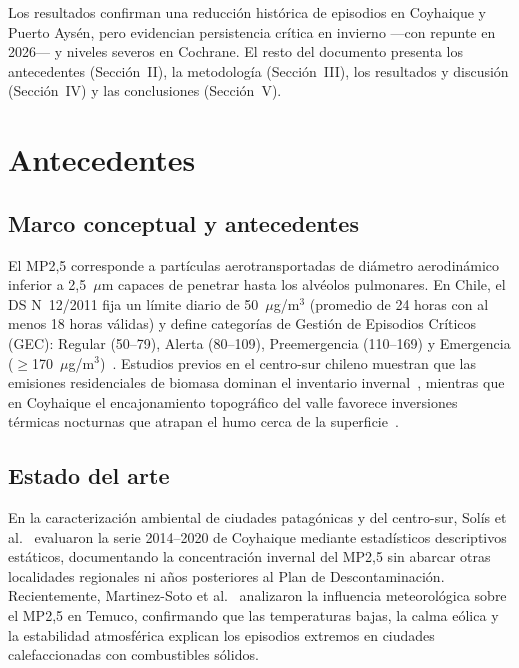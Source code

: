 \documentclass[conference]{IEEEtran}
\begin{document}
Los resultados confirman una reducci{\'o}n hist{\'o}rica de episodios en Coyhaique y Puerto Ays{\'e}n, pero evidencian persistencia cr{\'i}tica en invierno ---con repunte en 2026--- y niveles severos en Cochrane. El resto del documento presenta los antecedentes (Secci{\'o}n~II), la metodolog{\'i}a (Secci{\'o}n~III), los resultados y discusi{\'o}n (Secci{\'o}n~IV) y las conclusiones (Secci{\'o}n~V).

\section{Antecedentes}

\subsection{Marco conceptual y antecedentes}
El MP2,5 corresponde a part{\'i}culas aerotransportadas de di{\'a}metro aerodin{\'a}mico inferior a 2,5~$\mu$m capaces de penetrar hasta los alv{\'e}olos pulmonares. En Chile, el DS N\textdegree~12/2011 fija un l{\'i}mite diario de 50~$\mu$g/m$^3$ (promedio de 24 horas con al menos 18 horas v{\'a}lidas) y define categor{\'i}as de Gesti{\'o}n de Episodios Cr{\'i}ticos (GEC): Regular (50--79), Alerta (80--109), Preemergencia (110--169) y Emergencia ($\geq$170~$\mu$g/m$^3$)~\cite{mma2011ds12}. Estudios previos en el centro-sur chileno muestran que las emisiones residenciales de biomasa dominan el inventario invernal~\cite{molina2017}, mientras que en Coyhaique el encajonamiento topogr{\'a}fico del valle favorece inversiones t{\'e}rmicas nocturnas que atrapan el humo cerca de la superficie~\cite{solis2022}.

\subsection{Estado del arte}
En la caracterizaci{\'o}n ambiental de ciudades patag{\'o}nicas y del centro-sur, Sol{\'i}s et al.~\cite{solis2022} evaluaron la serie 2014--2020 de Coyhaique mediante estad{\'i}sticos descriptivos est{\'a}ticos, documentando la concentraci{\'o}n invernal del MP2,5 sin abarcar otras localidades regionales ni a{\~n}os posteriores al Plan de Descontaminaci{\'o}n. Recientemente, Martinez-Soto et al.~\cite{martinez2025} analizaron la influencia meteorol{\'o}gica sobre el MP2,5 en Temuco, confirmando que las temperaturas bajas, la calma e{\'o}lica y la estabilidad atmosf{\'e}rica explican los episodios extremos en ciudades calefaccionadas con combustibles s{\'o}lidos.
\end{document}
